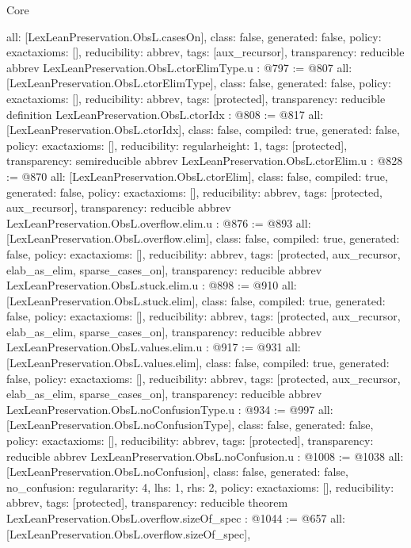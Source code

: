 \begin{lexlean}{Core}
\begin{coremodule}
{  all: [LexLeanPreservation.ObsL.casesOn],
  class: false,
  generated: false,
  policy: exact{axioms: []},
  reducibility: abbrev{},
  tags: [aux_recursor],
  transparency: reducible
}
abbrev LexLeanPreservation.ObsL.ctorElimType.{u} : @797 := @807 {
  all: [LexLeanPreservation.ObsL.ctorElimType],
  class: false,
  generated: false,
  policy: exact{axioms: []},
  reducibility: abbrev{},
  tags: [protected],
  transparency: reducible
}
definition LexLeanPreservation.ObsL.ctorIdx : @808 := @817 {
  all: [LexLeanPreservation.ObsL.ctorIdx],
  class: false,
  compiled: true,
  generated: false,
  policy: exact{axioms: []},
  reducibility: regular{height: 1},
  tags: [protected],
  transparency: semireducible
}
abbrev LexLeanPreservation.ObsL.ctorElim.{u} : @828 := @870 {
  all: [LexLeanPreservation.ObsL.ctorElim],
  class: false,
  compiled: true,
  generated: false,
  policy: exact{axioms: []},
  reducibility: abbrev{},
  tags: [protected, aux_recursor],
  transparency: reducible
}
abbrev LexLeanPreservation.ObsL.overflow.elim.{u} : @876 := @893 {
  all: [LexLeanPreservation.ObsL.overflow.elim],
  class: false,
  compiled: true,
  generated: false,
  policy: exact{axioms: []},
  reducibility: abbrev{},
  tags: [protected, aux_recursor, elab_as_elim, sparse_cases_on],
  transparency: reducible
}
abbrev LexLeanPreservation.ObsL.stuck.elim.{u} : @898 := @910 {
  all: [LexLeanPreservation.ObsL.stuck.elim],
  class: false,
  compiled: true,
  generated: false,
  policy: exact{axioms: []},
  reducibility: abbrev{},
  tags: [protected, aux_recursor, elab_as_elim, sparse_cases_on],
  transparency: reducible
}
abbrev LexLeanPreservation.ObsL.values.elim.{u} : @917 := @931 {
  all: [LexLeanPreservation.ObsL.values.elim],
  class: false,
  compiled: true,
  generated: false,
  policy: exact{axioms: []},
  reducibility: abbrev{},
  tags: [protected, aux_recursor, elab_as_elim, sparse_cases_on],
  transparency: reducible
}
abbrev LexLeanPreservation.ObsL.noConfusionType.{u} : @934 := @997 {
  all: [LexLeanPreservation.ObsL.noConfusionType],
  class: false,
  generated: false,
  policy: exact{axioms: []},
  reducibility: abbrev{},
  tags: [protected],
  transparency: reducible
}
abbrev LexLeanPreservation.ObsL.noConfusion.{u} : @1008 := @1038 {
  all: [LexLeanPreservation.ObsL.noConfusion],
  class: false,
  generated: false,
  no_confusion: regular{arity: 4, lhs: 1, rhs: 2},
  policy: exact{axioms: []},
  reducibility: abbrev{},
  tags: [protected],
  transparency: reducible
}
theorem LexLeanPreservation.ObsL.overflow.sizeOf_spec : @1044 := @657 {
  all: [LexLeanPreservation.ObsL.overflow.sizeOf_spec],
}
\end{coremodule}
\end{lexlean}
